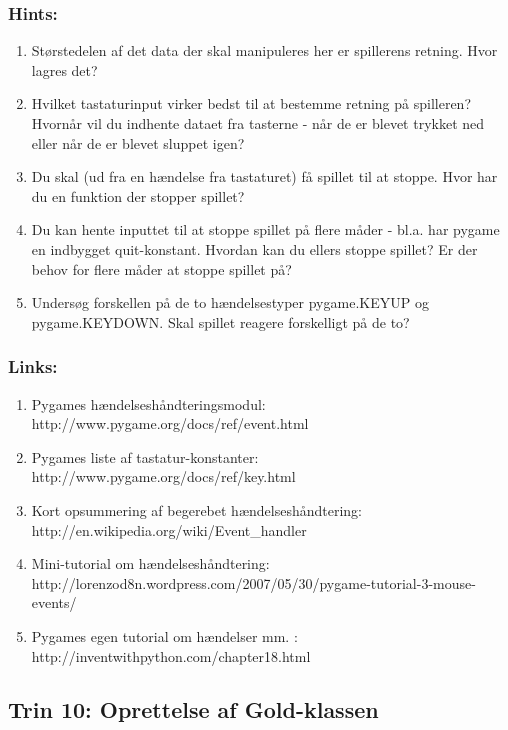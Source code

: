 \documentclass[10pt,a4paper,danish]{article}
\begin{document}
\subsubsection{Hints:}
\begin{enumerate}
\item Størstedelen af det data der skal manipuleres her er spillerens retning.
   Hvor lagres det?

\item Hvilket tastaturinput virker bedst til at bestemme retning på spilleren?
   Hvornår vil du indhente dataet fra tasterne - når de er blevet trykket ned
   eller når de er blevet sluppet igen?

\item Du skal (ud fra en hændelse fra tastaturet) få spillet til at stoppe. Hvor
   har du en funktion der stopper spillet?

\item Du kan hente inputtet til at stoppe spillet på flere måder - bl.a. har 
   pygame en indbygget quit-konstant. Hvordan kan du ellers stoppe spillet?
   Er der behov for flere måder at stoppe spillet på?

\item Undersøg forskellen på de to hændelsestyper pygame.KEYUP og pygame.KEYDOWN. 
   Skal spillet reagere forskelligt på de to?
\end{enumerate}
\subsubsection{Links:}
\begin{enumerate}
\item Pygames hændelseshåndteringsmodul: http://www.pygame.org/docs/ref/event.html
\item Pygames liste af tastatur-konstanter: http://www.pygame.org/docs/ref/key.html
\item Kort opsummering af begerebet hændelseshåndtering: http://en.wikipedia.org/wiki/Event\_handler
\item Mini-tutorial om hændelseshåndtering: http://lorenzod8n.wordpress.com/2007/05/30/pygame-tutorial-3-mouse-events/
\item Pygames egen tutorial om hændelser mm. : http://inventwithpython.com/chapter18.html
\end{enumerate}

\subsection{Trin 10: Oprettelse af Gold-klassen}
\end{document}
